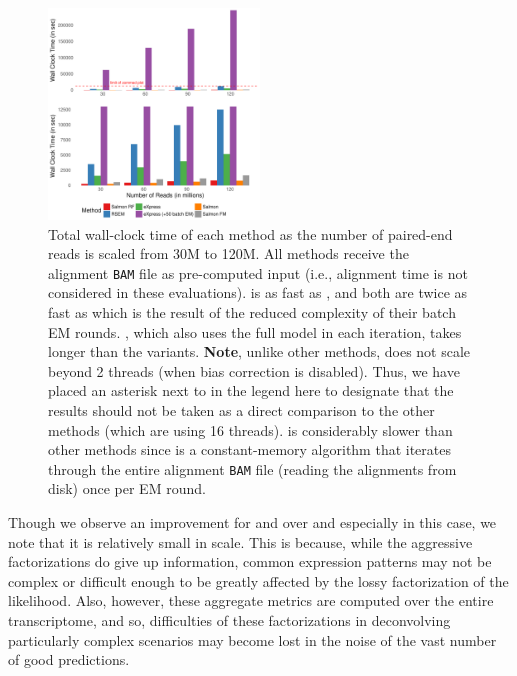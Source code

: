 \begin{figure}[h]
   \centering
   \includegraphics[width=0.5\textwidth]{Figures/DDFact/times_sim}
   \caption[Total wall-clock time of different methods]{Total wall-clock time of each 
   method as the number of paired-end reads is scaled from 30M to 120M. All methods receive 
   the alignment \texttt{BAM} file as pre-computed input (i.e., alignment time is not 
   considered in these evaluations). \salrf is as fast as \salmon, and both are twice as 
   fast as \salfm which is the result of the reduced complexity of their batch EM rounds. 
   \rsem, which also uses the full model in each iteration, takes longer than the \salmon 
   variants. \textbf{Note}, unlike other methods, \express does not scale beyond  2 threads 
   (when bias correction is disabled).  Thus, we have placed an asterisk next to \express in 
   the legend here to designate that the results should not be taken as a direct comparison 
   to the other methods (which are using 16 threads). \expressEM is considerably slower 
   than other methods since \express is a constant-memory algorithm that iterates through the 
   entire alignment \texttt{BAM} file (reading the alignments from disk) once per EM round.}
   \label{supfigure:time_anal}
\end{figure}


Though we observe an improvement for \salmonrf and \salmonfm over \salmon and
especially \salmonu in this case, we note that it is relatively small in scale.
This is because, while the aggressive \cb factorizations do give up information,
common expression patterns may not be complex or difficult enough to be greatly
affected by the lossy factorization of the likelihood. Also, however, these
aggregate metrics are computed over the entire transcriptome, and so,
difficulties of these factorizations in deconvolving particularly complex
scenarios may become lost in the noise of the vast number of good predictions.

